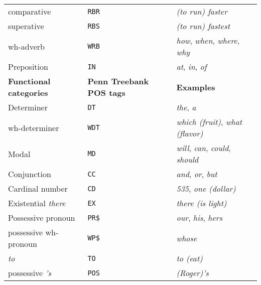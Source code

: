 \documentclass[letterpaper, 10pt]{article}
\begin{document}
\begin{table}[H]
\begin{tabular}{lll}
\quad{}comparative			& \texttt{RBR}						& \textit{(to run) faster}\\
\quad{}superative			& \texttt{RBS}						& \textit{(to run) fastest}\\
\quad{}wh-adverb				& \texttt{WRB}						& \textit{how}, \textit{when}, \textit{where}, \textit{why}\\
Preposition				& \texttt{IN}						& \textit{at}, \textit{in}, \textit{of}\\
\midrule
\textbf{Functional categories}		& \textbf{Penn Treebank POS tags}		& \textbf{Examples}\\
\midrule
Determiner				& \texttt{DT}						& \textit{the}, \textit{a}\\
\quad{}wh-determiner				& \texttt{WDT}						& \textit{which (fruit)}, \textit{what (flavor)}\\
Modal					& \texttt{MD}						& \textit{will}, \textit{can}, \textit{could}, \textit{should}\\
Conjunction				& \texttt{CC}						& \textit{and}, \textit{or}, \textit{but}\\
Cardinal number			& \texttt{CD}						& \textit{535}, \textit{one (dollar)}\\
Existential \textit{there}		& \texttt{EX}						& \textit{there (is light)}\\
Possessive pronoun			& \texttt{PR\$}						& \textit{our}, \textit{his}, \textit{hers}\\
\quad{}possessive wh-pronoun		& \texttt{WP\$}						& \textit{whose}\\
\textit{to}					& \texttt{TO}						& \textit{to (eat)}\\
possessive \textit{'s}			& \texttt{POS}						& \textit{(Roger)'s}\\

\bottomrule
\end{tabular}
\end{table}
\end{document}
